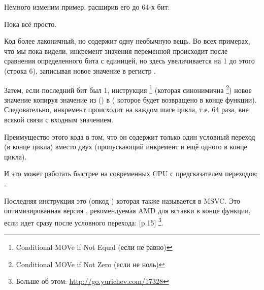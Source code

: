 \label{subsec:popcnt}

Немного изменим пример, расширив его до 64-х бит:




Пока всё просто.






Код более лаконичный, но содержит одну необычную вещь.
Во всех примерах, что мы пока видели, инкремент значения переменной  происходит после сравнения 
определенного бита с единицей, но здесь  увеличивается на 1 до этого (строка 6), записывая новое значение
в регистр \EDX.

Затем, если последний бит был 1, инструкция \CMOVNE\footnote{Conditional MOVe if Not Equal (\MOV если не равно)}
(которая синонимична \CMOVNZ\footnote{Conditional MOVe if Not Zero (\MOV если не ноль)})  
новое значение 
копируя значение из \EDX () 
в \EAX ( которое будет возвращено в конце функции).
Следовательно, инкремент происходит на каждом шаге цикла, т.е. 64 раза, вне всякой связи с входным
значением.

Преимущество этого кода в том, что он содержит только один условный переход (в конце цикла) вместо
двух (пропускающий инкремент  и ещё одного в конце цикла).

И это может работать быстрее на современных CPU с предсказателем переходов: .

\label{FATRET}
Последняя инструкция это  (опкод ) 
которая также называется  в MSVC.
Это оптимизированная версия \RET, рекомендуемая AMD для вставки в конце функции, если \RET идет
сразу после условного перехода: 
[\AMDOptimization p.15]
\footnote{Больше об этом: \url{http://go.yurichev.com/17328}}.




